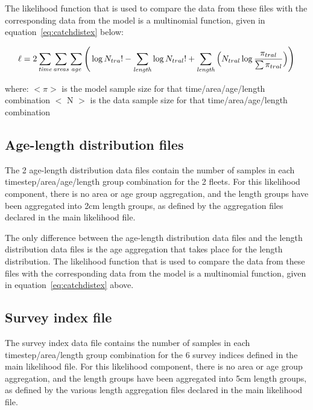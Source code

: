 \documentclass[10pt,titlepage]{article}
\begin{document}
\bigskip
The likelihood function that is used to compare the data from these files with the corresponding data from the model is a multinomial function, given in equation~\ref{eq:catchdistex} below:

\begin{equation}\label{eq:catchdistex}
\ell = 2 \sum_{\it time}\sum_{\it areas}\sum_{\it age} \Bigg( \log N_{tra}! - \sum_{\it length} \log N_{tral}! + \sum_{\it length} \Big( N_{tral} \log {\frac{\pi_{tral}}{\sum \pi_{tral}}} \Big)\Bigg)
\end{equation}

where:\newline
$<\pi>$ is the model sample size for that time/area/age/length combination\newline
$<$ N $>$ is the data sample size for that time/area/age/length combination

{\small }
{\small }

\subsection{Age-length distribution files}
The 2 age-length distribution data files contain the number of samples in each timestep/area/age/length group combination for the 2 fleets.  For this likelihood component, there is no area or age group aggregation, and the length groups have been aggregated into 2cm length groups, as defined by the aggregation files declared in the main likelihood file.

\bigskip
The only difference between the age-length distribution data files and the length distribution data files is the age aggregation that takes place for the length distribution.  The likelihood function that is used to compare the data from these files with the corresponding data from the model is a multinomial function, given in equation~\ref{eq:catchdistex} above.

{\small }
{\small }

\subsection{Survey index file}
The survey index data file contains the number of samples in each timestep/area/length group combination for the 6 survey indices defined in the main likelihood file.  For this likelihood component, there is no area or age group aggregation, and the length groups have been aggregated into 5cm length groups, as defined by the various length aggregation files declared in the main likelihood file.
\end{document}
